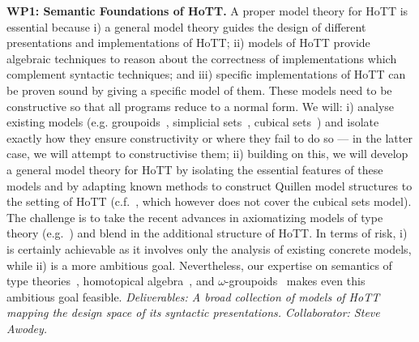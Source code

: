 \documentclass[a4paper,11pt]{article}
\begin{document}
{\bf WP1: Semantic Foundations of HoTT.}  %
A proper model theory for
HoTT is essential because i) a general model theory 
guides the design of different presentations and implementations of
HoTT; ii) models of HoTT provide algebraic techniques to reason
about the correctness of implementations which complement syntactic
techniques; and iii) specific implementations of HoTT can
be proven sound by giving a specific model of them.  These models
need to be constructive so that all programs reduce to a normal form.
We will: i) analyse existing models ({e.g.}
groupoids~\cite{HofmannM:groitt}, simplicial
sets~\cite{KapulkinC:simmuv}, cubical sets~\cite{BezemM:cubsmt}) and
isolate exactly how they ensure constructivity or where they fail to
do so --- in the latter case, we will attempt to constructivise them;
ii) building on this, we will develop a general model theory for HoTT
by isolating the essential features of these models and by adapting
known methods to construct Quillen model structures to the setting of
HoTT ({c.f.}~\cite{ShulmanM:uniidh}, which however does not cover the
cubical sets model).  The challenge is to take the recent advances in
axiomatizing models of type theory
({e.g.}~\cite{AwodeyS:natmtt}) and blend in the additional structure of HoTT. In terms
of risk, i) is certainly achievable as it involves only the
analysis of existing concrete models, while ii) is a more ambitious
goal. Nevertheless, our expertise on semantics of type
theories~\cite{neil2014relParamDep}, homotopical
algebra~\cite{GambinoN:homl2c,GambinoN:weilsh}, and
$\omega$-groupoids~\cite{alti:csl12} makes even this ambitious goal
feasible. {\em Deliverables: A broad collection of models of HoTT
mapping the design space of its syntactic presentations.
Collaborator: Steve Awodey.
}



\end{document}
